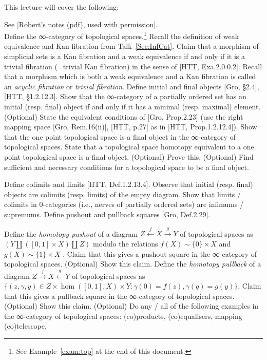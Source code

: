 \documentclass[a4paper]{amsart}
\numberwithin{figure}{section}
\theoremstyle{theorem}
\theoremstyle{definition}
\newcommand{\NN}{\mathbb{N}}
\newcommand{\Top}{{Top}}
\begin{document}
This lecture will cover the following:

See \href{InfCat5LC.pdf}{[Robert's notes (pdf), used with permission]}. \\%

Define the ∞-category of topological spaces.\footnote{%
See Example~\ref{exam:top} at the end of this document.
} %
Recall the definition of weak equivalence and Kan fibration from Talk~\ref{Sec:InfCat}. %
Claim that a morphism of simplicial sets is a Kan fibration and a weak equivalence if and only if it is a trivial fibration (=trivial Kan fibration) in the sense of [HTT, Exa.2.0.0.2]. %
Recall that a morphism which is both a weak equivalence and a Kan fibration is called an \emph{acyclic fibration} or \emph{trivial fibration}. %
Define initial and final objects [Gro, §2.4], [HTT, §1.2.12.3]. %
Show that the ∞-category of a partially ordered set has an initial (resp. final) object if and only if it has a minimal (resp. maximal) element. %
(Optional) State the equivalent conditions of [Gro, Prop.2.23] (use the right mapping space [Gro, Rem.16(ii)], [HTT, p.27] as in [HTT, Prop.1.2.12.4]). %
Show that the one point topological space is a final object in the ∞-category of topological spaces. %
State that a topological space homotopy equivalent to a one point topological space is a final object. %
(Optional) Prove this. %
(Optional) Find sufficient and necessary conditions for a topological space to be a final object. %

Define colimits and limits [HTT, Def.1.2.13.4]. %
Observe that initial (resp. final) objects are colimits (resp. limits) of the empty diagram. %
Show that limits / colimits in 0-categories (i.e., nerves of partially ordered sets) are infimums / supremums. %
Define pushout and pullback squares [Gro, Def.2.29]. %

Define the \emph{homotopy pushout} of a diagram $Z \stackrel{f}{\leftarrow} X \stackrel{g}{\to} Y$  of topological spaces as 
$(Y \amalg ([0,1]{\times} X) \amalg Z)$ modulo the relations $f(X) \sim \{0\} {\times} X$ and $g(X) \sim \{1\} {\times} X$
. %
Claim that this gives a pushout square in the ∞-category of topological spaces. %
(Optional) Show this claim. %
Define the \emph{homotopy pullback} of a diagram $Z \stackrel{f}{\rightarrow} X \stackrel{g}{\leftarrow} Y$  of topological spaces as $\{( z, \gamma, y) \in Z \times \hom([0,1], X) \times Y : \gamma(0) = f(z), \gamma(q) = g(y) \}$. %
Claim that this gives a pullback square in the ∞-category of topological spaces. %
(Optional) Show this claim. %
(Optional) Do any / all of the following examples in the ∞-category of topological spaces: (co)products, (co)equalisers, mapping (co)telescope. %
\end{document}
